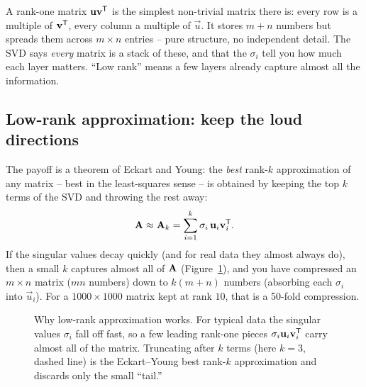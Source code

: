 \begin{intuitionbox}
A rank-one matrix $\mathbf{u}\mathbf{v}^{\mathsf{T}}$ is the simplest non-trivial matrix there is: every
row is a multiple of $\mathbf{v}^{\mathsf{T}}$, every column a multiple of $\vec{u}$. It stores
$m+n$ numbers but spreads them across $m\times n$ entries -- pure structure, no
independent detail. The SVD says \emph{every} matrix is a stack of these, and that the
$\sigma_i$ tell you how much each layer matters. ``Low rank'' means a few layers already
capture almost all the information.
\end{intuitionbox}

\subsection{Low-rank approximation: keep the loud directions}

The payoff is a theorem of Eckart and Young: the \emph{best} rank-$k$
approximation of any matrix -- best in the least-squares sense -- is obtained by keeping
the top $k$ terms of the SVD and throwing the rest away:
\[
\mathbf{A} \approx \mathbf{A}_k = \sum_{i=1}^{k} \sigma_i\,\mathbf{u}_i\mathbf{v}_i^{\mathsf{T}}.
\]
If the singular values decay quickly (and for real data they almost always do), then a
small $k$ captures almost all of $\mathbf{A}$ (Figure~\ref{ch34:fig-svdecay}), and you have
compressed an $m\times n$ matrix
($mn$ numbers) down to $k(m+n)$ numbers (absorbing each $\sigma_i$ into $\vec{u}_i$). For a $1000\times1000$ matrix kept at rank $10$,
that is a 50-fold compression.

\begin{figure}[H]
\centering
{}
\caption{Why low-rank approximation works. For typical data the singular values $\sigma_i$
fall off fast, so a few leading rank-one pieces $\sigma_i\mathbf{u}_i\mathbf{v}_i^{\mathsf{T}}$ carry almost
all of the matrix. Truncating after $k$ terms (here $k=3$, dashed line) is the Eckart--Young
best rank-$k$ approximation and discards only the small ``tail.''}
\label{ch34:fig-svdecay}
\end{figure}

